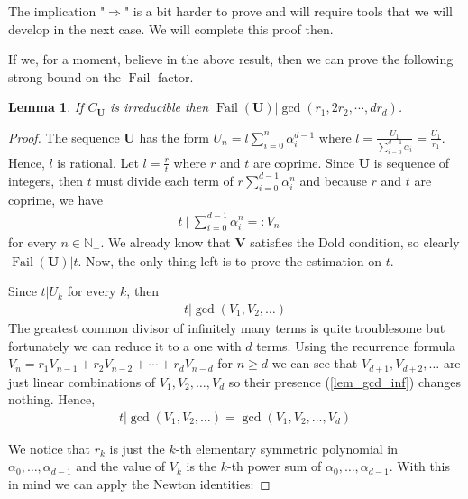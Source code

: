 \documentclass[preprint,12pt]{elsarticle}
\newcommand{\N}{\mathbb{N}}
\newcommand{\alphas}{\alpha_0,\ldots,\alpha_{d-1}}
\DeclareMathOperator{\fail}{Fail}
\newtheorem{lemma}{Lemma}
\begin{document}
The implication "$\Rightarrow$" is a bit harder to prove and will require tools that we will develop in the next case. We will complete this proof then.

If we, for a moment, believe in the above result, then we can prove the following strong bound on the $\fail$ factor.

\begin{lemma}\label{lem_gcd}
    If $C_\mathbf{U}$ is irreducible then $\fail(\mathbf{U})|\gcd(r_1, 2r_2, \cdots, dr_d)$.
\end{lemma}
\begin{proof}
    

The sequence $\mathbf{U}$ has the form ${U}_n = l\sum_{i=0}^n\alpha_i^{d-1}$ where $l = \frac{{U}_1}{\sum_{i=0}^{d-1}\alpha_i} = \frac{{U}_1}{r_1}$. Hence, $l$ is rational. Let $l=\frac{r}{t}$ where $r$ and $t$ are coprime. Since $\mathbf{U}$ is sequence of integers, then $t$ must divide each term of $r\sum_{i=0}^{d-1}\alpha_i^n$ and because $r$ and $t$ are coprime, we have
\begin{align}
    t\ |\  \sum_{i=0}^{d-1}\alpha_i^n =: {V}_n \quad
    \text{}
\end{align}
 for every $n\in\N_+$. We already know that $\mathbf{V}$ satisfies the Dold condition, so clearly $\fail(\mathbf{U})|t$. Now, the only thing left is to prove the estimation on $t$.


Since $t|{U}_k$ for every $k$, then 
\begin{align}\label{lem_gcd_inf}
    t | \gcd\left({V}_1, {V}_2, \ldots \right)
\end{align}
The greatest common divisor of infinitely many terms is quite troublesome but fortunately we can reduce it to a one with $d$ terms. Using the recurrence formula ${V}_n = r_1{V}_{n-1}+ r_2{V}_{n-2} + \cdots + r_d {V}_{n-d} $ for $n\geqslant d$ we can see that $ {V}_{d+1}, {V}_{d+2}, \ldots$ are just linear combinations of ${V}_1,{V}_2, \ldots,{V}_d $ so their presence (\ref{lem_gcd_inf}) changes nothing. Hence,
\begin{align}\label{lem_gcd_fin}
    t | \gcd\left({V}_1, {V}_2, \ldots \right) = 
    \gcd\left({V}_1, {V}_2, \ldots, {V}_d \right)
\end{align}

We notice that $r_k$ is just the $k$-th elementary symmetric polynomial in $\alphas$ and the value of ${V}_k$ is the $k$-th power sum of $\alphas$. With this in mind we can apply the Newton identities:


\end{proof}
\end{document}
